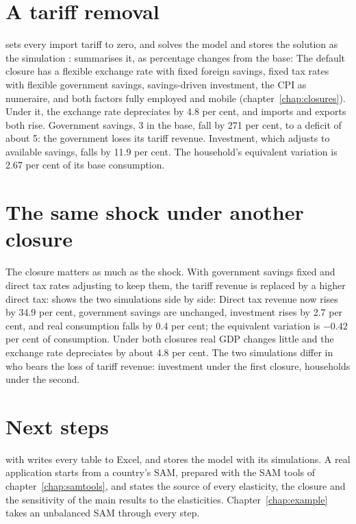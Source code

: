 \section{A tariff removal}

 sets every import tariff to zero, and 
solves the model and stores the solution as the simulation :
 summarises it, as percentage changes from the base:
The default closure has a flexible exchange rate with fixed foreign savings,
fixed tax rates with flexible government savings, savings-driven investment,
the CPI as numeraire, and both factors fully employed and mobile
(chapter~\ref{chap:closures}). Under it, the exchange rate depreciates by 4.8
per cent, and imports and exports both rise. Government savings, 3 in the
base, fall by 271 per cent, to a deficit of about 5: the government loses its
tariff revenue. Investment, which adjusts to available savings, falls by 11.9
per cent. The household's equivalent variation is 2.67 per cent of its base
consumption.

\section{The same shock under another closure}

The closure matters as much as the shock. With government savings fixed and
direct tax rates adjusting to keep them, the tariff revenue is replaced by a
higher direct tax:
 shows the two simulations side by side:
Direct tax revenue now rises by 34.9 per cent, government savings are
unchanged, investment rises by 2.7 per cent, and real consumption falls by 0.4
per cent; the equivalent variation is $-0.42$ per cent of consumption. Under
both closures real GDP changes little and the exchange rate depreciates by
about 4.8 per cent. The two simulations differ in who bears the loss of tariff
revenue: investment under the first closure, households under the second.

\section{Next steps}

 with  writes every table to Excel, and
 stores the model with its simulations. A real application
starts from a country's SAM, prepared with the SAM tools of
chapter~\ref{chap:samtools}, and states the source of every elasticity, the
closure and the sensitivity of the main results to the elasticities.
Chapter~\ref{chap:example} takes an unbalanced SAM through every step.
